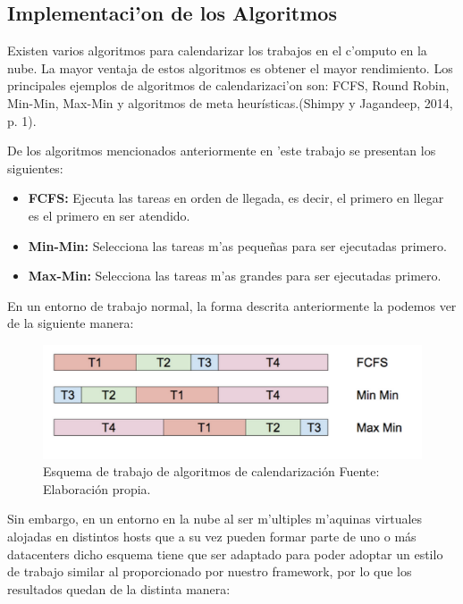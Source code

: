 \subsection{Implementaci'on de los Algoritmos}

Existen varios algoritmos para calendarizar los trabajos en el c'omputo en la nube. La mayor ventaja de estos algoritmos es obtener el mayor rendimiento. Los principales ejemplos de algoritmos de calendarizaci'on son: FCFS, Round Robin, Min-Min, Max-Min y algoritmos de meta heurísticas.(Shimpy y Jagandeep, 2014, p. 1).

De los algoritmos mencionados anteriormente en 'este trabajo se presentan los siguientes:


\begin{itemize}
	\item  \textbf{FCFS:} Ejecuta las tareas en orden de llegada, es decir, el primero en llegar es el primero en ser atendido.
	\item  \textbf{Min-Min:} Selecciona las tareas m'as pequeñas para ser ejecutadas primero.
	\item  \textbf{Max-Min:} Selecciona las tareas m'as grandes para ser ejecutadas primero.
\end{itemize}

En un entorno de trabajo normal, la forma descrita anteriormente la podemos ver de la siguiente manera:

\begin{figure}
	\caption{Esquema de trabajo de algoritmos de calendarización
		Fuente: Elaboración propia.}
	\centering
	\includegraphics[scale=0.5]{media/imagendos}
\end{figure}


\newpage
Sin embargo, en un entorno en la nube al ser m'ultiples m'aquinas virtuales alojadas en distintos hosts que a su vez pueden formar parte de uno o más datacenters dicho esquema tiene que ser adaptado para poder adoptar un estilo de trabajo similar al proporcionado por nuestro framework, por lo que los resultados quedan de la distinta manera:


